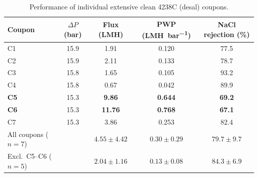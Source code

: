 \begin{table}[htbp]
  \centering
  \caption{Performance of individual extensive clean 4238C (desal) coupons.}
  \label{tab:clean-desal-coupons}
  \begin{tabular}{lcccc}
    \toprule
    Coupon & $\Delta P$ (\unit{bar}) & Flux (\unit{LMH}) & PWP (\unit{LMH.bar^{-1}}) & NaCl rejection (\%) \\
    \midrule
    C1 & 15.9 & 1.91 & 0.120 & 77.5 \\
    C2 & 15.9 & 2.11 & 0.133 & 78.7 \\
    C3 & 15.8 & 1.65 & 0.105 & 93.2 \\
    C4 & 15.8 & 0.67 & 0.042 & 89.9 \\
    \textbf{C5} & 15.3 & \textbf{9.86} & \textbf{0.644} & \textbf{69.2} \\
    \textbf{C6} & 15.3 & \textbf{11.76} & \textbf{0.768} & \textbf{67.1} \\
    C7 & 15.3 & 3.86 & 0.253 & 82.4 \\
    \midrule
    All coupons ($n = 7$)     & & $4.55 \pm 4.42$ & $0.30 \pm 0.29$ & $79.7 \pm 9.7$ \\
    Excl.\ C5--C6 ($n = 5$)   & & $2.04 \pm 1.16$ & $0.13 \pm 0.08$ & $84.3 \pm 6.9$ \\
    \bottomrule
  \end{tabular}
\end{table}

